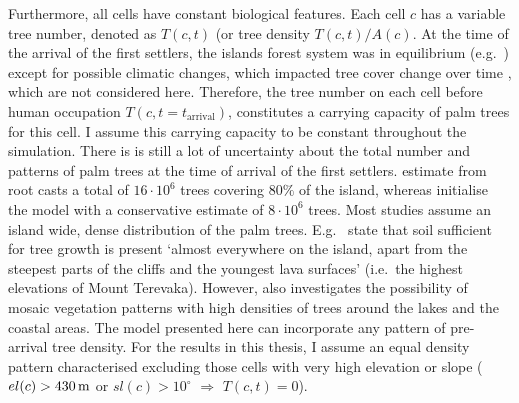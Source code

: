 
Furthermore, all cells have constant biological features.%
Each cell $c$ has a variable tree number, denoted as $T(c,t)$ (or tree density $T(c,t)/A(c)$.
At the time of the arrival of the first settlers, the islands forest system was in equilibrium (e.g.\ \citet{Brander1998}) except for possible climatic changes, which impacted tree cover change over time \citep{Rull2020}, which are not considered here. 
Therefore, the tree number on each cell before human occupation $T(c,t=t_\text{arrival})$, constitutes a carrying capacity of palm trees for this cell. 
I assume this carrying capacity to be constant throughout the simulation.
There is is still a lot of uncertainty about the total number and patterns of palm trees at the time of arrival of the first settlers. 
\citet{MiethBork2015} estimate from root casts a total of $16\cdot 10^6$ trees covering $80\%$ of the island, whereas \citet{Brandt2015} initialise the model with a conservative estimate of $8\cdot 10^6$ trees. 
Most studies assume an island wide, dense distribution of the palm trees. 
E.g.\ \citet{Bahn2017} state that soil sufficient for tree growth is present `almost everywhere on the island, apart from the steepest parts of the cliffs and the youngest lava surfaces' (i.e.\ the highest elevations of Mount Terevaka). 
However, \citet{Rull2020} also investigates the possibility of mosaic vegetation patterns with high densities of trees around the lakes and the coastal areas.
The model presented here can incorporate any pattern of pre-arrival tree density. 
For the results in this thesis, I assume an equal density pattern characterised excluding those cells with very high elevation or slope ($el(c)>430\, {\rm m}$ or $sl(c)>10^\circ$ $\Rightarrow$ $T(c,t) = 0$).
